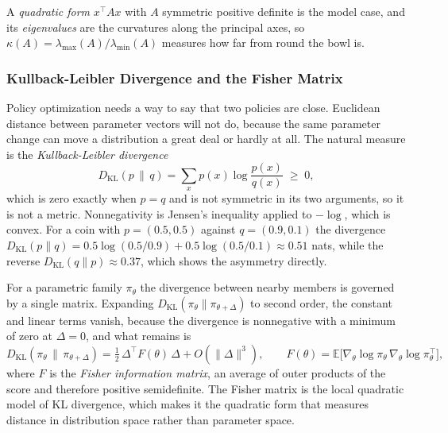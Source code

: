 A \emph{quadratic form} $x^\top A x$ with $A$ symmetric positive definite is the model case, and its \emph{eigenvalues} are the curvatures along the principal axes, so $\kappa(A) = \lambda_{\max}(A)/\lambda_{\min}(A)$ measures how far from round the bowl is.

\subsubsection{Kullback-Leibler Divergence and the Fisher Matrix}

Policy optimization needs a way to say that two policies are close. Euclidean distance between parameter vectors will not do, because the same parameter change can move a distribution a great deal or hardly at all. The natural measure is the \emph{Kullback-Leibler divergence}
\begin{equation}
D_{\mathrm{KL}}(p \,\|\, q) = \sum_x p(x) \log \frac{p(x)}{q(x)} \;\geq\; 0 ,
\label{eq:prelim_kl}
\end{equation}
which is zero exactly when $p = q$ and is not symmetric in its two arguments, so it is not a metric. Nonnegativity is Jensen's inequality applied to $-\log$, which is convex. For a coin with $p = (0.5, 0.5)$ against $q = (0.9, 0.1)$ the divergence $D_{\mathrm{KL}}(p \| q) = 0.5\log(0.5/0.9) + 0.5\log(0.5/0.1) \approx 0.51$ nats, while the reverse $D_{\mathrm{KL}}(q \| p) \approx 0.37$, which shows the asymmetry directly.

For a parametric family $\pi_\theta$ the divergence between nearby members is governed by a single matrix. Expanding $D_{\mathrm{KL}}(\pi_\theta \| \pi_{\theta + \Delta})$ to second order, the constant and linear terms vanish, because the divergence is nonnegative with a minimum of zero at $\Delta = 0$, and what remains is
\begin{equation}
D_{\mathrm{KL}}(\pi_\theta \,\|\, \pi_{\theta + \Delta}) = \tfrac{1}{2}\,\Delta^\top F(\theta)\, \Delta + O(\|\Delta\|^3),
\qquad
F(\theta) = \mathbb{E}\bigl[ \nabla_\theta \log \pi_\theta \, \nabla_\theta \log \pi_\theta^\top \bigr],
\label{eq:prelim_fisher}
\end{equation}
where $F$ is the \emph{Fisher information matrix}, an average of outer products of the score and therefore positive semidefinite. The Fisher matrix is the local quadratic model of KL divergence, which makes it the quadratic form that measures distance in distribution space rather than parameter space.

